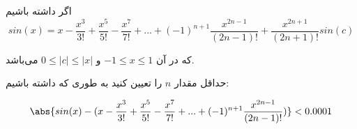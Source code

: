 اگر داشته باشیم 
$$sin(x) = x - \frac{x^{3}}{3!} + \frac{x^{5}}{5!} - \frac{x^{7}}{7!} + . . . + (-1)^{n+1} \frac{x^{2n-1}}{(2n-1)!} + \frac{x^{2n + 1}}{(2n+1)!}sin(c)$$

که در آن 
$-1 \leq x \leq 1$
و
$0 \leq |c| \leq |x|$
می‌باشد.

حداقل مقدار $n$ را تعیین کنید به طوری که داشته باشیم:

$$\abs{sin(x) - (x - \frac{x^{3}}{3!} + \frac{x^{5}}{5!} - \frac{x^{7}}{7!} + . . . + (-1)^{n+1} \frac{x^{2n-1}}{(2n-1)!})} < 0.0001$$

\begin{comment}

پاسخ:

برای این منظور باید $x = 1$ باشد. در این حالت صرفا کافی است معدله‌ی زیر را حل نماییم:
$$\frac{1}{(2n+1)!}sin(c) < 0.0001$$
$$10000 sin(c) < (2n+1)!$$
حداکثر مقدار 
$sin(c)$
برابر است با 
$sin(1)$
چرا که تابع سینوس در این بازه صعودی است.
$$10000 sin(1) = 8414 < (2n+1)! $$
پس داریم:
$$n \geq 4$$

\end{comment}